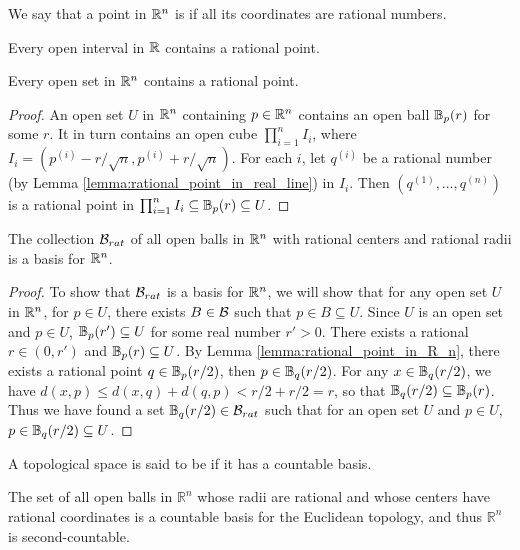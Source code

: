 \documentclass[11pt,a4paper]{article}
\begin{document}
We say that a point in $\mathbb{R}^n$ is  if all its coordinates are rational numbers.

\begin{lemma}\label{lemma:rational_point_in_real_line}
Every open interval in $\mathbb{R}$ contains a rational point.
\end{lemma}

\begin{lemma}\label{lemma:rational_point_in_R_n}
Every open set in $\mathbb{R}^n$ contains a rational point.
\end{lemma}

\begin{proof}
An open set $U$ in $\mathbb{R}^n$ containing $p\in\mathbb{R}^n$ contains an open ball $\mathbb{B}_p(r)$ for some $r$. It in turn contains an open cube $\prod_{i=1}^n I_i$, where $I_i =  (p^{(i)}-r/\sqrt{n}, p^{(i)}+r/\sqrt{n})$. For each $i$, let $q^{(i)}$ be a rational number (by Lemma \ref{lemma:rational_point_in_real_line}) in $I_i$. Then $(q^{(1)},\ldots,q^{(n)})$ is a rational point in $\prod_{i=1}^n I_i\subseteq \mathbb{B}_p(r)\subseteq U$.
\end{proof}

\begin{proposition}
The collection $\mathcal{B}_{rat}$ of all open balls in $\mathbb{R}^n$ with rational centers and rational radii is a basis for $\mathbb{R}^n$.
\end{proposition}

\begin{proof}
To show that $\mathcal{B}_{rat}$ is a basis for $\mathbb{R}^n$, we will show that for any open set $U$ in $\mathbb{R}^n$, for $p\in U$, there exists $B\in\mathcal{B}$ such that $p\in B\subseteq U$. Since $U$ is an open set and $p\in U$, $\mathbb{B}_p(r')\subseteq U$ for some real number $r'>0$. There exists a rational $r\in (0,r')$ and $\mathbb{B}_p(r)\subseteq U$. By Lemma \ref{lemma:rational_point_in_R_n}, there exists a rational point $q\in\mathbb{B}_p(r/2)$, then $p\in \mathbb{B}_q(r/2)$. For any $x\in \mathbb{B}_q(r/2)$, we have $d(x,p)\le d(x,q)+d(q,p) < r/2+r/2 = r$, so that $\mathbb{B}_q(r/2)\subseteq \mathbb{B}_p(r)$. Thus we have found a set $\mathbb{B}_q(r/2)\in \mathcal{B}_{rat}$ such that for an open set $U$ and $p\in U$, $p\in \mathbb{B}_q(r/2)\subseteq U$.
\end{proof}

\begin{definition}
    A topological space is said to be  if it has a countable basis.
\end{definition}

\begin{proposition}
    The set of all open balls in $\mathbb{R}^n$ whose radii are rational and whose centers have rational coordinates is a countable basis for the Euclidean topology, and thus $\mathbb{R}^n$ is second-countable.
\end{proposition}
\end{document}
